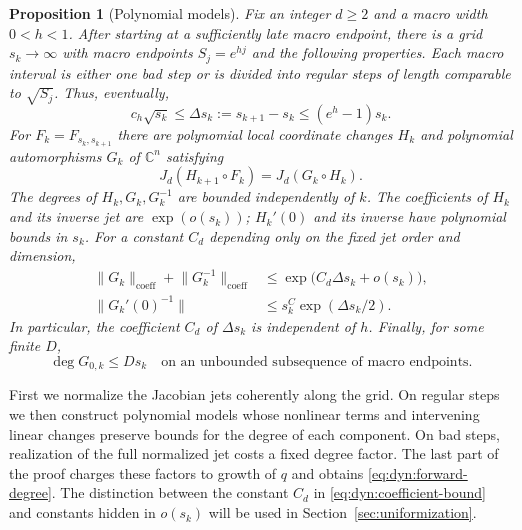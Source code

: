 \documentclass[11pt]{article}
\newtheorem{proposition}[theorem]{Proposition}
\theoremstyle{definition}
\theoremstyle{remark}
\newcommand{\C}{\mathbb C}
\newcommand{\norm}[1]{\lVert#1\rVert}
\numberwithin{equation}{section}
\begin{document}
\begin{proposition}[Polynomial models]\label{prop:polynomial-models}
Fix an integer $d\ge2$ and a macro width $0<h<1$.  After starting at a
sufficiently late macro endpoint, there is a grid $s_k\to\infty$ with
macro endpoints $S_j=e^{hj}$ and the following properties.  Each macro
interval is either one bad step or is divided into regular steps of
length comparable to $\sqrt{S_j}$.  Thus, eventually,
\begin{equation}
 c_h\sqrt{s_k}\le\Delta s_k:=s_{k+1}-s_k
 \le(e^h-1)s_k.
 \label{eq:dyn:grid-size}
\end{equation}
For $F_k=F_{s_k,s_{k+1}}$ there are polynomial local coordinate changes
$H_k$ and polynomial automorphisms $G_k$ of $\C^n$ satisfying
\begin{equation}
 J_d(H_{k+1}\circ F_k)=J_d(G_k\circ H_k).
 \label{eq:dyn:jet-conjugacy}
\end{equation}
The degrees of $H_k,G_k,G_k^{-1}$ are bounded independently of $k$.
The coefficients of $H_k$ and its inverse jet are $\exp(o(s_k))$;
$H_k'(0)$ and its inverse have polynomial bounds in $s_k$.
For a constant $C_d$ depending only on the fixed jet order and dimension,
\begin{align}
 \norm{G_k}_{\mathrm{coeff}}+\norm{G_k^{-1}}_{\mathrm{coeff}}
 &\le \exp\bigl(C_d\Delta s_k+o(s_k)\bigr),
 \label{eq:dyn:coefficient-bound}\\
 \norm{G_k'(0)^{-1}}
 &\le s_k^{C}\exp(\Delta s_k/2).
 \label{eq:dyn:center-inverse}
\end{align}
In particular, the coefficient $C_d$ of $\Delta s_k$ is independent of
$h$.  Finally, for some finite $D$,
\begin{equation}
 \deg G_{0,k}\le D s_k
 \quad\text{on an unbounded subsequence of macro endpoints.}
 \label{eq:dyn:forward-degree}
\end{equation}
\end{proposition}

First we normalize the Jacobian jets coherently along the grid.
On regular steps we then construct polynomial models whose nonlinear
terms and intervening linear changes preserve bounds for the degree of
each component.  On bad steps, realization of the full normalized jet
costs a fixed degree factor.  The last part of the proof charges these
factors to growth of $q$ and obtains \eqref{eq:dyn:forward-degree}.
The distinction between the constant $C_d$ in
\eqref{eq:dyn:coefficient-bound} and constants hidden in $o(s_k)$ will
be used in Section~\ref{sec:uniformization}.
\end{document}
